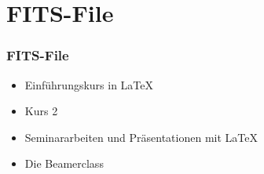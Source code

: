 


\section{FITS-File}
\begin{frame}
\frametitle{FITS-File}
\begin{itemize}
\item  Einf\"uhrungskurs in \LaTeX{} \pause 
\item  Kurs 2 \pause 
\item  Seminararbeiten und Pr\"asentationen mit \LaTeX{} \pause 
\item  Die Beamerclass
\end{itemize} 
\end{frame}